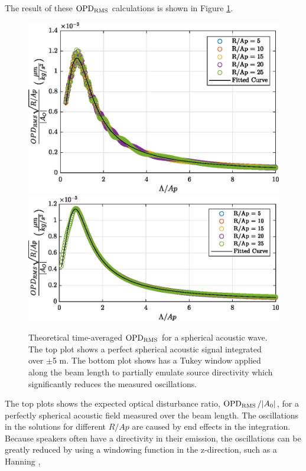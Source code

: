 The result of these $\operatorname{OPD_{RMS}}$ calculations is shown in Figure \ref{fig:03_spherical_sample}.
\begin{figure}
  \centering
  \includegraphics{../matlab/03_aero_optics_acoustics/spherical_sample.eps}
  \includegraphics{../matlab/03_aero_optics_acoustics/spherical_sample_win.eps}
  \caption{Theoretical time-averaged $\operatorname{OPD_{RMS}}$ for a spherical acoustic wave. The top plot shows a perfect spherical acoustic signal integrated over $\pm$5 m. The bottom plot shows has a Tukey window applied along the beam length to partially emulate source directivity which significantly reduces the measured oscillations.}
  \label{fig:03_spherical_sample}
\end{figure}
The top plots shows the expected optical disturbance ratio, $\operatorname{OPD_{RMS}}/|A_0|$, for a perfectly spherical acoustic field measured over the beam length.
The oscillations in the solutions for different $R/Ap$ are caused by end effects in the integration.
Because speakers often have a directivity in their emission, the oscillations can be greatly reduced by using a windowing function in the z-direction, such as a Hanning \cite{Oppenheim-1999-cfwyTmwq},
